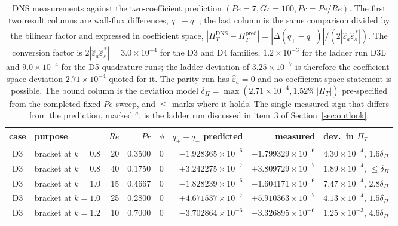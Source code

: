 \documentclass[12pt,a4paper]{article}
\newcommand{\Rey}{\mathit{Re}}
\newcommand{\Pe}{\mathit{Pe}}
\newcommand{\Grr}{\mathit{Gr}}
\renewcommand{\Pr}{\mathit{Pr}}
\newcommand{\PiT}{\Pi_T}
\newenvironment{ruledtabular}{}{}
\begin{document}
\begin{table}[htb]
  \centering
  \caption{DNS measurements against the two-coefficient prediction
  $(\Pe=7,\Grr=100,\Pr=\Pe/\Rey)$. The first two result columns are wall-flux
  differences, $q_+-q_-$; the last column is the same comparison divided by the
  bilinear factor and expressed in coefficient space,
  $|\PiT^{\mathrm{DNS}}-\PiT^{\mathrm{pred}}|
  =|\Delta(q_+-q_-)|/(2|\widehat\varepsilon_a\widehat\varepsilon_s^{\,*}|)$.
  The conversion factor is $2|\widehat\varepsilon_a
  \widehat\varepsilon_s^{\,*}|=3.0\times10^{-4}$ for the D3 and D4 families,
  $1.2\times10^{-3}$ for the ladder run D3L and $9.0\times10^{-4}$ for the D5
  quadrature runs; the ladder deviation of $3.25\times10^{-7}$ is therefore the
  coefficient-space deviation $2.71\times10^{-4}$ quoted for it. The parity run
  has $\widehat\varepsilon_a=0$ and no coefficient-space statement is possible.
  The bound column is the deviation model
  $\delta_\Pi=\max(2.71\times10^{-4},1.52\%\,|\PiT|)$ pre-specified from the
  completed fixed-$\Pe$ sweep, and $\le$ marks where it holds. The single
  measured sign that differs from the prediction, marked $^{a}$, is the ladder
  run discussed in item~3 of Section~\ref{sec:outlook}.}
  \label{tab:dns_predictions}
  \begin{ruledtabular}
  \scriptsize
  \setlength{\tabcolsep}{4pt}
  \begin{tabular}{@{\hspace{3pt}}clrrcrrl@{\hspace{3pt}}}
  case & purpose & $\Rey$ & $\Pr$ & $\phi$ & $q_+-q_-$ predicted & measured
  & dev.\ in $\PiT$ \\ \hline
  D3  & bracket at $k=0.8$  & 20 & 0.3500 & $0$ & $-1.928365\times10^{-6}$ & $-1.799329\times10^{-6}$ & $4.30\times10^{-4}$, $1.6\delta_\Pi$ \\
  D3  & bracket at $k=0.8$  & 40 & 0.1750 & $0$ & $+3.242275\times10^{-7}$ & $+3.809729\times10^{-7}$ & $1.89\times10^{-4}$, $\le\delta_\Pi$ \\
  D3  & bracket at $k=1.0$  & 15 & 0.4667 & $0$ & $-1.828239\times10^{-6}$ & $-1.604171\times10^{-6}$ & $7.47\times10^{-4}$, $2.8\delta_\Pi$ \\
  D3  & bracket at $k=1.0$  & 25 & 0.2800 & $0$ & $+4.671537\times10^{-7}$ & $+5.910363\times10^{-7}$ & $4.13\times10^{-4}$, $1.5\delta_\Pi$ \\
  D3  & bracket at $k=1.2$  & 10 & 0.7000 & $0$ & $-3.702864\times10^{-6}$ & $-3.326895\times10^{-6}$ & $1.25\times10^{-3}$, $4.6\delta_\Pi$ \\

\end{tabular}
\end{ruledtabular}
\end{table}
\end{document}
